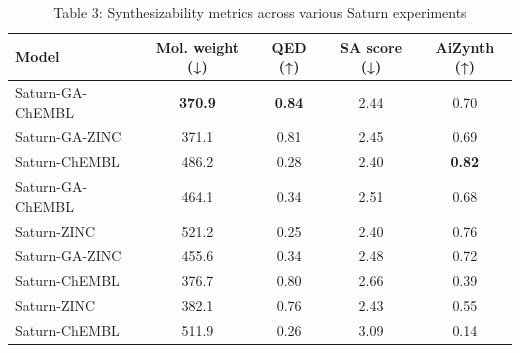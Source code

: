 \begin{table}[t]
\centering
\caption{Table 3: Synthesizability metrics across various Saturn experiments}
\label{tab:2407.12186}
\begin{tabular}{lcccc}
\toprule
Model & Mol. weight (↓) & QED (↑) & SA score (↓) & AiZynth (↑) \\
\midrule
Saturn-GA-ChEMBL & \textbf{370.9} & \textbf{0.84} & 2.44 & 0.70 \\
Saturn-GA-ZINC & 371.1 & 0.81 & 2.45 & 0.69 \\
Saturn-ChEMBL & 486.2 & 0.28 & 2.40 & \textbf{0.82} \\
Saturn-GA-ChEMBL & 464.1 & 0.34 & 2.51 & 0.68 \\
Saturn-ZINC & 521.2 & 0.25 & 2.40 & 0.76 \\
Saturn-GA-ZINC & 455.6 & 0.34 & 2.48 & 0.72 \\
Saturn-ChEMBL & 376.7 & 0.80 & 2.66 & 0.39 \\
Saturn-ZINC & 382.1 & 0.76 & 2.43 & 0.55 \\
Saturn-ChEMBL & 511.9 & 0.26 & 3.09 & 0.14 \\
\bottomrule
\end{tabular}
\end{table}
